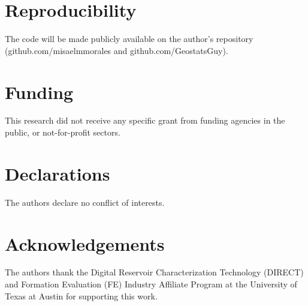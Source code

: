 \documentclass[10pt, twoside]{article}
\begin{document}
\section*{\textbf{Reproducibility}}
The code will be made publicly available on the author's repository (github.com/misaelmmorales and github.com/GeostatsGuy).

\section*{\textbf{Funding}}
This research did not receive any specific grant from funding agencies in the public, or not-for-profit sectors.

\section*{\textbf{Declarations}}
The authors declare no conflict of interests.

\section*{\textbf{Acknowledgements}}
The authors thank the Digital Reservoir Characterization Technology (DIRECT) and Formation Evaluation (FE) Industry Affiliate Program at the University of Texas at Austin for supporting this work.


\end{document}
